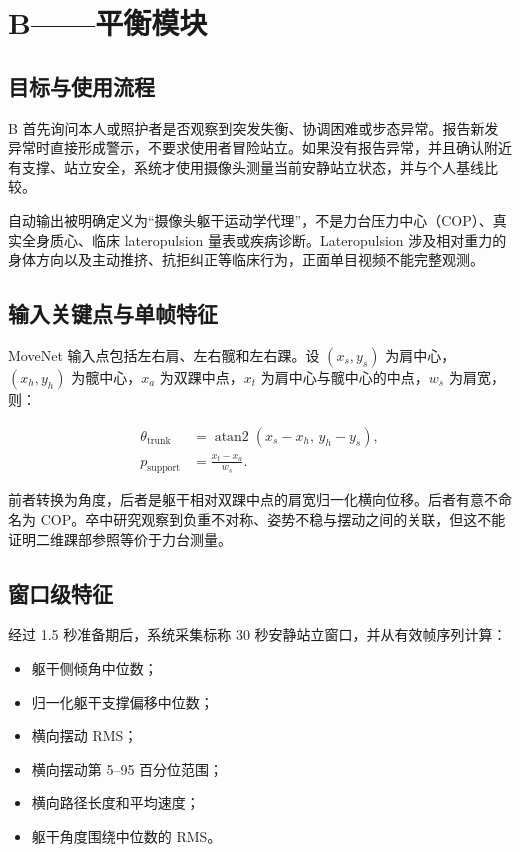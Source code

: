 \documentclass[11pt,a4paper]{article}
\begin{document}
\section{B——平衡模块}

\subsection{目标与使用流程}

B 首先询问本人或照护者是否观察到突发失衡、协调困难或步态异常。报告新发异常时直接形成警示，不要求使用者冒险站立。如果没有报告异常，并且确认附近有支撑、站立安全，系统才使用摄像头测量当前安静站立状态，并与个人基线比较。

自动输出被明确定义为“摄像头躯干运动学代理”，不是力台压力中心（COP）、真实全身质心、临床 lateropulsion 量表或疾病诊断。Lateropulsion 涉及相对重力的身体方向以及主动推挤、抗拒纠正等临床行为，正面单目视频不能完整观测\cite{dai2021lateropulsion,dai2022lateropulsion}。

\subsection{输入关键点与单帧特征}

MoveNet 输入点包括左右肩、左右髋和左右踝。设 $(x_s,y_s)$ 为肩中心，$(x_h,y_h)$ 为髋中心，$x_a$ 为双踝中点，$x_t$ 为肩中心与髋中心的中点，$w_s$ 为肩宽，则：

\begin{align}
\theta_{\mathrm{trunk}} & = \operatorname{atan2}(x_s-x_h,\,y_h-y_s), \\
p_{\mathrm{support}} & = \frac{x_t-x_a}{w_s}.
\end{align}

前者转换为角度，后者是躯干相对双踝中点的肩宽归一化横向位移。后者有意不命名为 COP。卒中研究观察到负重不对称、姿势不稳与摆动之间的关联，但这不能证明二维踝部参照等价于力台测量\cite{kamphuis2013asymmetry,yeung2014kinect}。

\subsection{窗口级特征}

经过 1.5 秒准备期后，系统采集标称 30 秒安静站立窗口，并从有效帧序列计算：

\begin{itemize}
  \item 躯干侧倾角中位数；
  \item 归一化躯干支撑偏移中位数；
  \item 横向摆动 RMS；
  \item 横向摆动第 5--95 百分位范围；
  \item 横向路径长度和平均速度；
  \item 躯干角度围绕中位数的 RMS。
\end{itemize}
\end{document}
